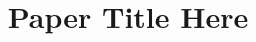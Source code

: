 \documentclass[format=sigconf,10pt,natbib=false,authordraft]{acmart}
\begin{document}
\title{Paper Title Here}

\begin{sloppypar}

\maketitle







\end{sloppypar}
\end{document}
